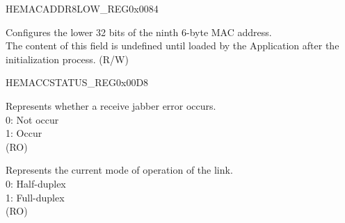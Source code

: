 \begin{register}{H}{EMACADDR8LOW\_REG}{0x0084}\label{regdesc:EMACADDR8LOWREG}
%
\regnewline%
\begin{regdesc}\begin{reglist}
\item [EMACADDR8LOW\_REG] Configures the lower 32 bits of the ninth 6-byte MAC address.\\The content of this field is undefined until loaded by the Application after the initialization process. (R/W)
\end{reglist}\end{regdesc}
\end{register}




\begin{register}{H}{EMACCSTATUS\_REG}{0x00D8}\label{regdesc:EMACCSTATUSREG}
%
%
%
%
%
%
\regnewline%
\begin{regdesc}\begin{reglist}
\item [JABBER\_TIMEOUT]  Represents whether a receive jabber error occurs.\\
0: Not occur\\
1: Occur\\ (RO)
\item [LINK\_MODE]  Represents the current mode of operation of the link.\\
0: Half-duplex\\
1: Full-duplex\\ (RO)
\end{reglist}\end{regdesc}
\end{register}


